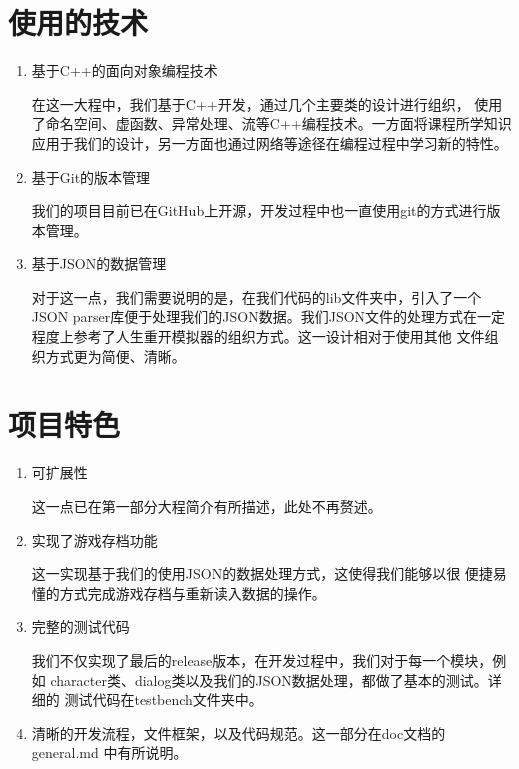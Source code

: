 \documentclass[UTF8]{ctexart}
\begin{document}
    \section{使用的技术}
    \begin{enumerate}
        \item 基于C++的面向对象编程技术
        
        在这一大程中，我们基于C++开发，通过几个主要类的设计进行组织，
        使用了命名空间、虚函数、异常处理、流等C++编程技术。一方面将课程所学知识
        应用于我们的设计，另一方面也通过网络等途径在编程过程中学习新的特性。
        \item 基于Git的版本管理
        
        我们的项目目前已在GitHub上开源，开发过程中也一直使用git的方式进行版本管理。
        \item 基于JSON的数据管理
        
        对于这一点，我们需要说明的是，在我们代码的lib文件夹中，引入了一个
        JSON parser库便于处理我们的JSON数据。我们JSON文件的处理方式在一定
        程度上参考了人生重开模拟器的组织方式。这一设计相对于使用其他
        文件组织方式更为简便、清晰。
    \end{enumerate}

    \section{项目特色}
    \begin{enumerate}
        \item 可扩展性
        
        这一点已在第一部分大程简介有所描述，此处不再赘述。
        \item 实现了游戏存档功能
        
        这一实现基于我们的使用JSON的数据处理方式，这使得我们能够以很
        便捷易懂的方式完成游戏存档与重新读入数据的操作。

        \item 完整的测试代码
        
        我们不仅实现了最后的release版本，在开发过程中，我们对于每一个模块，例如
        character类、dialog类以及我们的JSON数据处理，都做了基本的测试。详细的
        测试代码在testbench文件夹中。

        \item 清晰的开发流程，文件框架，以及代码规范。这一部分在doc文档的general.md
        中有所说明。
    \end{enumerate}
\end{document}
